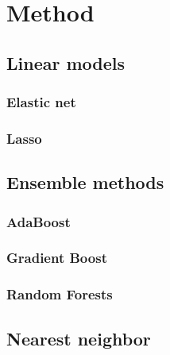 \section{Method}
\label{sec:method}

\subsection{Linear models}
\label{sub:linear_models}

\subsubsection{Elastic net}
\label{ssub:elastic_net}

\subsubsection{Lasso}
\label{ssub:lasso}

\subsection{Ensemble methods}
\label{sub:ensemble_methods}
\subsubsection{AdaBoost}
\label{ssub:adaboost}
\subsubsection{Gradient Boost}
\label{ssub:gradient_boost}
\subsubsection{Random Forests}
\label{ssub:random_forests}

\subsection{Nearest neighbor}
\label{sub:nearest_neighbor}


